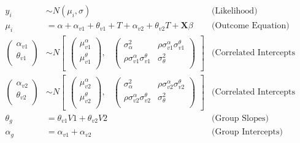 \documentclass[12pt]{article}
\begin{document}
\begin{align*}
y_i &\sim N(\mu_i, \sigma) &\text{(Likelihood)} \\
\mu_i &= \alpha + \alpha_{v1} + \theta_{v1} + \textit{T} + \alpha_{v2} + \theta_{v2} \textit{T} + \textbf{X} \beta &\text{(Outcome Equation)}  \\ 
\begin{pmatrix} 
\alpha_{v1} \\
\theta_{v1} \\
\end{pmatrix} &\sim  N
\begin{bmatrix}
\begin{pmatrix}
\mu^\alpha_{v1} \\
\mu^\theta_{v1} \\
\end{pmatrix}\!\!,&
\begin{pmatrix}
\sigma^2_\alpha & \rho \sigma^\alpha_{v1} \sigma^\theta_{v1} \\
\rho \sigma^\alpha_{v1} \sigma^\theta_{v1} & \sigma^2_\theta \\
\end{pmatrix}
\end{bmatrix} & \text{(Correlated Intercepts and Slopes: V1)} \\ 
\begin{pmatrix} 
\alpha_{v2} \\
\theta_{v2} \\
\end{pmatrix} &\sim  N
\begin{bmatrix}
\begin{pmatrix}
\mu^\alpha_{v2} \\
\mu^\theta_{v2} \\
\end{pmatrix}\!\!,&
\begin{pmatrix}
\sigma^2_\alpha & \rho \sigma^\alpha_{v2} \sigma^\theta_{v2} \\
\rho \sigma^\alpha_{v2} \sigma^\theta_{v2} & \sigma^2_\theta \\
\end{pmatrix}
\end{bmatrix} & \text{(Correlated Intercepts and Slopes: V2)} \\ 
\theta_g &= \theta_{v1} \textit{V1} + \theta_{v2} \textit{V2} & \text{(Group Slopes)} \\
\alpha_g &= \alpha_{v1} + \alpha_{v2} & \text{(Group Intercepts)} \\
\end{align*}
\end{document}
